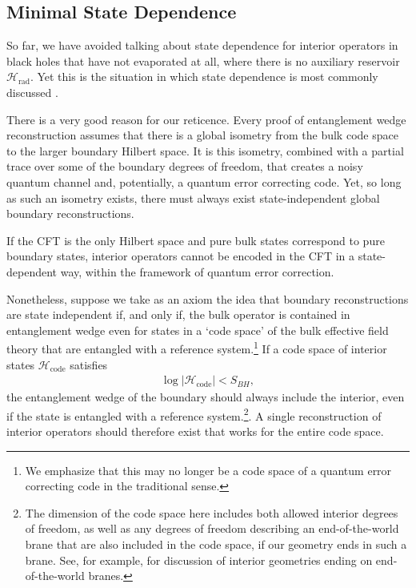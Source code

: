 \documentclass[12pt]{article}
\begin{document}
\subsection{Minimal State Dependence} \label{sec:minimal}

So far, we have avoided talking about state dependence for interior operators in black holes that have not evaporated at all, where there is no auxiliary reservoir $\mathcal{H}_\text{rad}$. Yet this is the situation in which state dependence is most commonly discussed \cite{papadodimas2013infalling, papadodimas2014state, kourkoulou2017pure}.

There is a very good reason for our reticence. Every proof of entanglement wedge reconstruction assumes that there is a global isometry from the bulk code space to the larger boundary Hilbert space. It is this isometry, combined with a partial trace over some of the boundary degrees of freedom, that creates a noisy quantum channel and, potentially, a quantum error correcting code. Yet, so long as such an isometry exists, there must always exist state-independent global boundary reconstructions. 

If the CFT is the only Hilbert space and pure bulk states correspond to pure boundary states, interior operators cannot be encoded in the CFT in a state-dependent way, within the framework of quantum error correction.

Nonetheless, suppose we take as an axiom the idea that boundary reconstructions are state independent if, and only if, the bulk operator is contained in entanglement wedge even for states in a `code space' of the bulk effective field theory that are entangled with a reference system.\footnote{We emphasize that this may no longer be a code space of a quantum error correcting code in the traditional sense.} If a code space of interior states $\mathcal{H}_\text{code}$ satisfies
\begin{align}\label{eq:smallenoughspace}
\log |\mathcal{H}_\text{code}| < S_{BH},
\end{align}
the entanglement wedge of the boundary should always include the interior, even if the state is entangled with a reference system.\footnote{The dimension of the code space here includes both allowed interior degrees of freedom, as well as any degrees of freedom describing an end-of-the-world brane that are also included in the code space, if our geometry ends in such a brane. See, for example, \cite{kourkoulou2017pure, cooper2018black} for discussion of interior geometries ending on end-of-the-world branes.}. A single reconstruction of interior operators should therefore exist that works for the entire code space.
\end{document}
